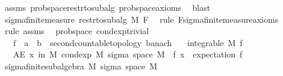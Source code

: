 \begin{isabellebody}
\ assms\ prob{\isacharunderscore}{\kern0pt}space{\isacharunderscore}{\kern0pt}restr{\isacharunderscore}{\kern0pt}to{\isacharunderscore}{\kern0pt}subalg\ prob{\isacharunderscore}{\kern0pt}space{\isacharunderscore}{\kern0pt}axioms\ \isamarkupfalse%
\ blast\isanewline
\ \ \isamarkupfalse%
\ {\isachardoublequoteopen}sigma{\isacharunderscore}{\kern0pt}finite{\isacharunderscore}{\kern0pt}measure\ {\isacharparenleft}{\kern0pt}restr{\isacharunderscore}{\kern0pt}to{\isacharunderscore}{\kern0pt}subalg\ M\ F{\isacharparenright}{\kern0pt}{\isachardoublequoteclose}\ \isamarkupfalse%
\ {\isacharparenleft}{\kern0pt}rule\ F{\isachardot}{\kern0pt}sigma{\isacharunderscore}{\kern0pt}finite{\isacharunderscore}{\kern0pt}measure{\isacharunderscore}{\kern0pt}axioms{\isacharparenright}{\kern0pt}\isanewline
{}\isamarkupfalse%
\ {\isacharparenleft}{\kern0pt}rule\ assms{\isacharparenright}{\kern0pt}%
\endisatagproof
{\isafoldproof}%
%
\isadelimproof
\isanewline
%
\endisadelimproof
\isanewline
{}\isamarkupfalse%
\ {\isacharparenleft}{\kern0pt}\ prob{\isacharunderscore}{\kern0pt}space{\isacharparenright}{\kern0pt}\ cond{\isacharunderscore}{\kern0pt}exp{\isacharunderscore}{\kern0pt}trivial{\isacharcolon}{\kern0pt}\isanewline
\ \ \ f\ {\isacharcolon}{\kern0pt}{\isacharcolon}{\kern0pt}\ {\isachardoublequoteopen}{\isacharprime}{\kern0pt}a\ {\isasymRightarrow}\ {\isacharprime}{\kern0pt}b\ {\isacharcolon}{\kern0pt}{\isacharcolon}{\kern0pt}\ {\isacharbraceleft}{\kern0pt}second{\isacharunderscore}{\kern0pt}countable{\isacharunderscore}{\kern0pt}topology{\isacharcomma}{\kern0pt}\ banach{\isacharbraceright}{\kern0pt}{\isachardoublequoteclose}\isanewline
\ \ \ {\isachardoublequoteopen}integrable\ M\ f{\isachardoublequoteclose}\isanewline
\ \ \ {\isachardoublequoteopen}AE\ x\ in\ M{\isachardot}{\kern0pt}\ cond{\isacharunderscore}{\kern0pt}exp\ M\ {\isacharparenleft}{\kern0pt}sigma\ {\isacharparenleft}{\kern0pt}space\ M{\isacharparenright}{\kern0pt}\ {\isacharbraceleft}{\kern0pt}{\isacharbraceright}{\kern0pt}{\isacharparenright}{\kern0pt}\ f\ x\ {\isacharequal}{\kern0pt}\ expectation\ f{\isachardoublequoteclose}\isanewline
%
\isadelimproof
%
\endisadelimproof
%
\isatagproof
{}\isamarkupfalse%
\ {\isacharminus}{\kern0pt}\isanewline
\ \ \isamarkupfalse%
\ sigma{\isacharunderscore}{\kern0pt}finite{\isacharunderscore}{\kern0pt}subalgebra\ M\ {\isachardoublequoteopen}sigma\ {\isacharparenleft}{\kern0pt}space\ M{\isacharparenright}{\kern0pt}\ {\isacharbraceleft}{\kern0pt}{\isacharbraceright}{\kern0pt}{\isachardoublequoteclose}\ \isamarkupfalse%

\end{isabellebody}
